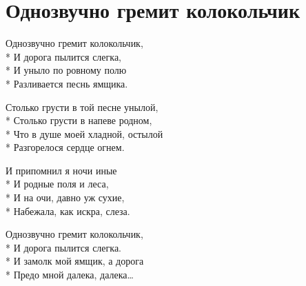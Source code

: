 \vspace{\fill}\newpage

\section{Однозвучно гремит колокольчик}
\label{song:Однозвучно_гремит_колокольчик}

\medskip

\begin{minipage}{\linewidth}
Однозвучно гремит колокольчик,\\*
И дорога пылится слегка,\\*
И уныло по ровному полю\\*
Разливается песнь ямщика.\\
\end{minipage}\par\medskip\nobreak

\medskip

\begin{minipage}{\linewidth}
Столько грусти в той песне унылой,\\*
Столько грусти в напеве родном,\\*
Что в душе моей хладной, остылой\\*
Разгорелося сердце огнем.\\
\end{minipage}\par\medskip\nobreak

\medskip

\begin{minipage}{\linewidth}
И припомнил я ночи иные\\*
И родные поля и леса,\\*
И на очи, давно уж сухие,\\*
Набежала, как искра, слеза.\\
\end{minipage}\par\medskip\nobreak

\medskip

\begin{minipage}{\linewidth}
Однозвучно гремит колокольчик,\\*
И дорога пылится слегка.\\*
И замолк мой ямщик, а дорога\\*
Предо мной далека, далека…\\
\end{minipage}


